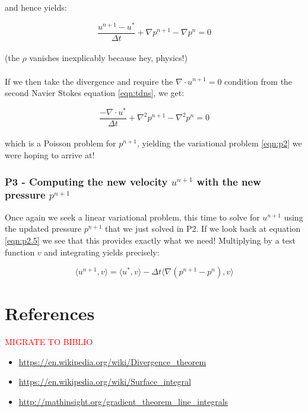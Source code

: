 \documentclass[english, 11pt]{article}
\newcommand{\Langle}{\Big\langle}
\newcommand{\Rangle}{\Big\rangle}
\begin{document}
and hence yields:

\begin{equation}\label{eqn:p2.5}
	\frac{u^{n+1} - u^*}{\Delta t} + \nabla p^{n+1} - \nabla p^n = 0 
\end{equation}
\\

(the $\rho$ vanishes inexplicably because hey, physics!)\\
\\

If we then take the divergence and require the $\nabla \cdot u^{n+1} = 0$ condition from the second Navier Stokes equation \ref{eqn:tdns}, we get:

\[ \frac{-\nabla \cdot u^*}{\Delta t} + \nabla^2p^{n+1} - \nabla^2p^n = 0 \]
\\

which is a Poisson problem for $p^{n+1}$, yielding the variational problem \ref{eqn:p2} we were hoping to arrive at!
\\


\subsubsection{P3 - Computing the new velocity $u^{n+1}$ with the new pressure $p^{n+1}$}

Once again we seek a linear variational problem, this time to solve for $u^{n+1}$ using the updated pressure $p^{n+1}$ that we just solved in P2. If we look back at equation \ref{eqn:p2.5} we see that this provides exactly what we need! Multiplying by a test function $v$ and integrating yields precisely:

\begin{equation}\label{eqn:p3}
	\Langle u^{n+1}, v \Rangle = \Langle u^*, v \Rangle - \Delta t \Langle \nabla(p^{n+1} - p^n) , v \Rangle
\end{equation}
	
\newpage	
\section{References}
\textcolor{red}{MIGRATE TO BIBLIO}
	\begin{itemize}
		\item \url{https://en.wikipedia.org/wiki/Divergence_theorem}
		\item \url{https://en.wikipedia.org/wiki/Surface_integral}
		\item \url{http://mathinsight.org/gradient_theorem_line_integrals}
	\end{itemize}
	
	
	
	
\nocite{*}
\pagebreak

 

  
\end{document}
